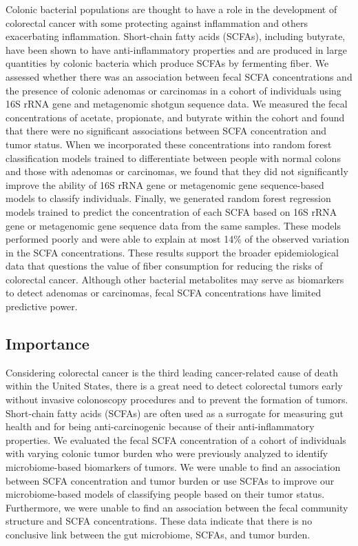 \documentclass[11pt,]{article}
\begin{document}
Colonic bacterial populations are thought to have a role in the
development of colorectal cancer with some protecting against
inflammation and others exacerbating inflammation. Short-chain fatty
acids (SCFAs), including butyrate, have been shown to have
anti-inflammatory properties and are produced in large quantities by
colonic bacteria which produce SCFAs by fermenting fiber. We assessed
whether there was an association between fecal SCFA concentrations and
the presence of colonic adenomas or carcinomas in a cohort of
individuals using 16S rRNA gene and metagenomic shotgun sequence data.
We measured the fecal concentrations of acetate, propionate, and
butyrate within the cohort and found that there were no significant
associations between SCFA concentration and tumor status. When we
incorporated these concentrations into random forest classification
models trained to differentiate between people with normal colons and
those with adenomas or carcinomas, we found that they did not
significantly improve the ability of 16S rRNA gene or metagenomic gene
sequence-based models to classify individuals. Finally, we generated
random forest regression models trained to predict the concentration of
each SCFA based on 16S rRNA gene or metagenomic gene sequence data from
the same samples. These models performed poorly and were able to explain
at most 14\% of the observed variation in the SCFA concentrations. These
results support the broader epidemiological data that questions the
value of fiber consumption for reducing the risks of colorectal cancer.
Although other bacterial metabolites may serve as biomarkers to detect
adenomas or carcinomas, fecal SCFA concentrations have limited
predictive power.

\newpage

\hypertarget{importance}{%
\subsection{Importance}\label{importance}}

Considering colorectal cancer is the third leading cancer-related cause
of death within the United States, there is a great need to detect
colorectal tumors early without invasive colonoscopy procedures and to
prevent the formation of tumors. Short-chain fatty acids (SCFAs) are
often used as a surrogate for measuring gut health and for being
anti-carcinogenic because of their anti-inflammatory properties. We
evaluated the fecal SCFA concentration of a cohort of individuals with
varying colonic tumor burden who were previously analyzed to identify
microbiome-based biomarkers of tumors. We were unable to find an
association between SCFA concentration and tumor burden or use SCFAs to
improve our microbiome-based models of classifying people based on their
tumor status. Furthermore, we were unable to find an association between
the fecal community structure and SCFA concentrations. These data
indicate that there is no conclusive link between the gut microbiome,
SCFAs, and tumor burden.
\end{document}
